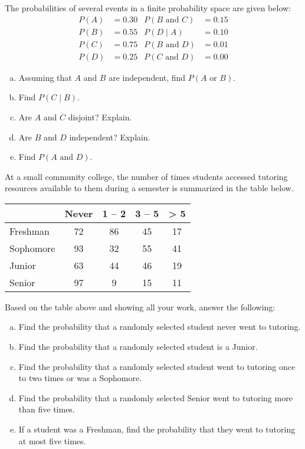 \documentclass[11pt,letterpaper]{article}
\begin{document}

 The probabilities of several events in a finite probability space are given below:
	\[
	\begin{aligned}
	P(A)&= 0.30 & P(B \text{ and } C)&= 0.15 \\
	P(B)&= 0.55 & P(D \;|\; A)&= 0.10 \\
	P(C)&= 0.75 & P(B \text{ and } D)&= 0.01 \\
	P(D)&= 0.25 & P(C \text{ and } D)&= 0.00
	\end{aligned}
	\] 
\begin{enumerate}[(a)]
\item Assuming that $A$ and $B$ are independent, find $P(A \text{ or } B)$.
\item Find $P(C \;|\; B)$.
\item Are $A$ and $C$ disjoint? Explain.
\item Are $B$ and $D$ independent? Explain. 
\item Find $P(A \text{ and } D)$. 
\end{enumerate}



\newpage



 At a small community college, the number of times students accessed tutoring resources available to them during a semester is summarized in the table below. \par
	\begin{table}[!ht]
	\centering
	\begin{tabular}{|l||c|c|c|c|} \hline
	& Never & 1 -- 2 & 3 -- 5 & > 5 \\ \hline \hline
	Freshman & 72 & 86 & 45 & 17 \\ \hline
	Sophomore & 93 & 32 & 55 & 41 \\ \hline
	Junior & 63 & 44 & 46 & 19 \\ \hline
	Senior & 97 & 9 & 15 & 11 \\ \hline
	\end{tabular}
	\end{table} \par
Based on the table above and showing all your work, answer the following:
\begin{enumerate}[(a)]
\item Find the probability that a randomly selected student never went to tutoring.
\item Find the probability that a randomly selected student is a Junior.
\item Find the probability that a randomly selected student went to tutoring once to two times or was a Sophomore. 
\item Find the probability that a randomly selected Senior went to tutoring more than five times. 
\item If a student was a Freshman, find the probability that they went to tutoring at most five times. 
\end{enumerate}
\end{document}
